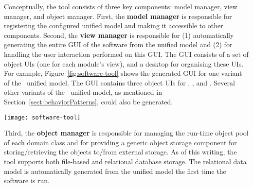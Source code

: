 Conceptually, the tool consists of three key components: model manager, view manager, and object manager. First, the \textbf{model manager} is responsible for registering the configured unified model and making it accessible to other components. 
Second, the \textbf{view manager} is responsible for (1) automatically generating the entire GUI of the software from the unified model and (2) for handling the user interaction performed on this GUI. The GUI consists of a set of object UIs (one for each module's view), and a desktop for organising these UIs. For example, Figure~\ref{fig:software-tool} shows the generated GUI for one variant of the \courseman~unified model. The GUI contains three object UIs for , , and .
Several other variants of the \courseman~unified model, as mentioned in Section~\ref{sect:behaviorPatterns}, could also be generated. 
\begin{figure*}[ht]
	\centering
	\texttt{[image: software-tool]}
	\caption{The GUI of \courseman~software generated by the tool: (1) desktop, 
		(2-4) the object UIs of , , and .} %
	\label{fig:software-tool}
\end{figure*}
Third, the \textbf{object manager} is responsible for managing the run-time object pool of each domain class and for providing a generic object storage component for storing/retrieving the objects to/from external storage. As of this writing, the tool supports both file-based and relational database storage. The relational data model is automatically generated from the unified model the first time the software is run.